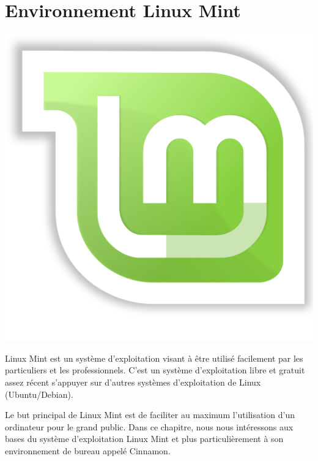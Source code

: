 \documentclass[12pt]{book}
\begin{document}
\chapter{Environnement Linux Mint}
\begin{minipage}[ct]{.18\textwidth}\hspace*{-2cm}
	\centering
	\includegraphics[width=.85\textwidth]{include/lm_logo.png}
\end{minipage}
\begin{minipage}[c]{.77\textwidth}\hspace*{.4cm}
	Linux Mint est un système d'exploitation visant à être utilisé facilement par les particuliers et les professionnels.
	C'est un système d'exploitation libre et gratuit assez récent s'appuyer sur d'autres systèmes d'exploitation de Linux (Ubuntu/Debian).
\end{minipage}
\begin{minipage}[c]{.77\textwidth}\hspace*{.4cm}
	Le but principal de Linux Mint est de faciliter au maximum l'utilisation d'un ordinateur pour le grand public.\newline\hspace*{.4cm}
	Dans ce chapitre, nous nous intéressons aux bases du système d'exploitation Linux Mint et plus particulièrement à son environnement de bureau appelé Cinnamon.
\end{minipage}
\end{document}
